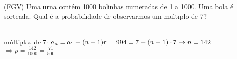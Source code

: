 \begin{ex}
(FGV) Uma urna contém 1000 bolinhas numeradas de 1 a 1000. Uma bola é sorteada. Qual é a probabilidade de observarmos um múltiplo de 7?
  \begin{sol}
   \phantom{A} \\
   múltiplos de 7:  $a_n=a_1+(n-1)r \hspace{0,5cm } 994=7+(n-1)\cdot7 \rightarrow n=142$ \\ $ \Longrightarrow p=\frac{142}{1000}=\frac{71}{500}$ 
  \end{sol}
\end{ex}